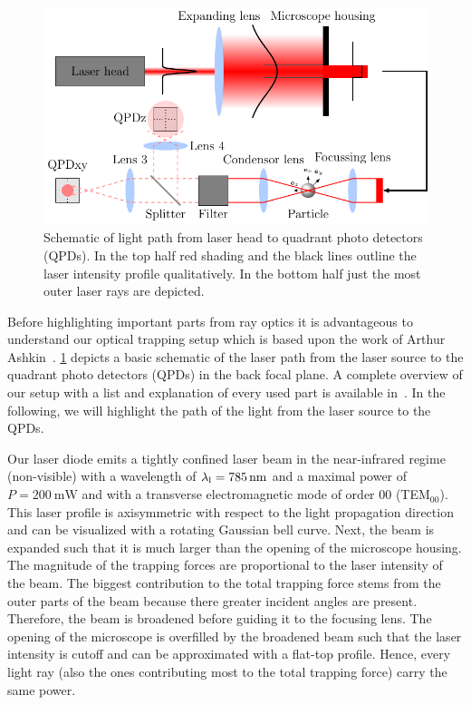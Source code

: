 \begin{figure}[tbp]
  \centering
  \includegraphics[]{External/setup.pdf}
  \caption{Schematic of light path from laser head to quadrant photo detectors 
  (QPDs). In the top half red shading and the black lines outline the laser 
intensity profile qualitatively. In the bottom half just the most outer laser 
rays are depicted.}
  \label{fig:TO-setup}
\end{figure}

Before highlighting important parts from ray optics it is advantageous to 
understand our optical trapping setup which is based upon the work of Arthur 
Ashkin~\cite{Ashkin1978,Ashkin1987,Ashkin2002,Ashkin1986,Ashkin1992,Ashkin1997}. 
\cref{fig:TO-setup} depicts a basic schematic of the laser path from the laser 
source to the quadrant photo detectors (QPDs) in the back focal plane. A 
complete overview of our setup with a list and explanation of every used part 
is available in~\cite{Lamprecht2017}. In the following, we will highlight the 
path of the light from the laser source to the QPDs.

Our laser diode emits a tightly confined laser beam in the near-infrared regime 
(non-visible) with a wavelength of $\lal=\SI{785}{\nm}$ and a maximal power of 
$P=\SI{200}{\milli\watt}$ and with a transverse electromagnetic mode of order 
00 (TEM$_{00}$). This laser profile is axisymmetric with respect to the light 
propagation direction and can be visualized with a rotating Gaussian bell 
curve. Next, the beam is expanded such that it is much larger than the opening 
of the microscope housing. The magnitude of the trapping forces are 
proportional to the laser intensity of the beam. The biggest contribution to 
the total trapping force stems from the outer parts of the beam because there 
greater incident angles are present. Therefore, the beam is broadened before 
guiding it to the focusing lens. The opening of the microscope is overfilled by 
the broadened beam such that the laser intensity is cutoff and can be 
approximated with a flat-top profile. Hence, every light ray (also the ones 
contributing most to the total trapping force) carry the same power.

